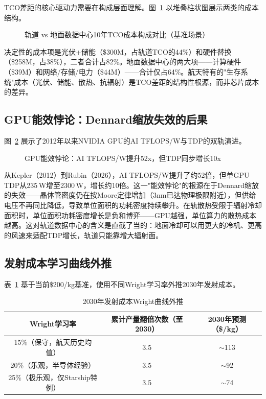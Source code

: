 TCO差距的核心驱动力需要在构成层面理解。图~\ref{fig:tco_breakdown} 以堆叠柱状图展示两类的成本结构。

\begin{figure}[H]
\centering

\caption{轨道 vs 地面数据中心10年TCO成本构成对比（基准场景）}
\label{fig:tco_breakdown}
\end{figure}

决定性的成本项是光伏+储能（\$300M，占轨道TCO的44\%）和硬件替换（\$258M，占38\%），二者合计占82\%。地面数据中心的两大项——计算硬件（\$39M）和网络/存储/电力（\$44M）——合计仅占64\%。航天特有的"生存系统"成本（光伏、储能、散热、抗辐射）是TCO差距的结构性根源，而非芯片成本的差异。

\subsection{GPU能效悖论：Dennard缩放失效的后果}

图~\ref{fig:gpu_paradox} 展示了2012年以来NVIDIA GPU的AI TFLOPS/W与TDP的双轨演进。

\begin{figure}[H]
\centering

\caption{GPU能效悖论：AI TFLOPS/W提升52x，但TDP同步增长10x}
\label{fig:gpu_paradox}
\end{figure}

从Kepler（2012）到Rubin（2026），AI TFLOPS/W提升了约52倍，但单GPU TDP从235\,W增至2300\,W，增长约10倍。这一"能效悖论"的根源在于Dennard缩放的失效——晶体管密度仍在按Moore定律增加（3nm已达物理极限附近\cite{tsmc2026symposium}），但供给电压不再同比降低，导致单位面积的功耗密度持续攀升。在轨散热受限于辐射冷却面积时，单位面积功耗密度增长是负和博弈——GPU越强，单位算力的散热成本越高。这对轨道数据中心的含义是直截了当的：地面冷却可以用更大的冷机、更高的风速来适配TDP增长，轨道只能靠增大辐射面。

\subsection{发射成本学习曲线外推}

表~\ref{tab:launch_2030} 基于当前\$200/kg基准，使用不同Wright学习率外推2030年发射成本。

\begin{table}[H]
\centering
\footnotesize
\caption{2030年发射成本Wright曲线外推}
\label{tab:launch_2030}
\begin{tabular}{ccc}
\toprule
\textbf{Wright学习率} & \textbf{累计产量翻倍次数（至2030）} & \textbf{2030年预测（\$/kg）} \\
\midrule
15\%（保守，航天历史均值\cite{guangfa2026learning}） & 3.5 & $\sim$113 \\
20\%（乐观，半导体经验\cite{guangfa2026learning}） & 3.5 & $\sim$92 \\
25\%（极乐观，仅Starship特例） & 3.5 & $\sim$74 \\
\bottomrule
\end{tabular}
\end{table}

